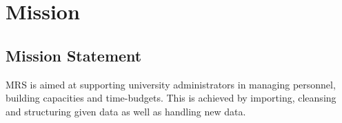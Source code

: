 \chapter{Mission}
\section{Mission Statement}
MRS is aimed at supporting university administrators in managing personnel, building capacities and time-budgets.
This is achieved by importing, cleansing and structuring given data as well as handling new data.
